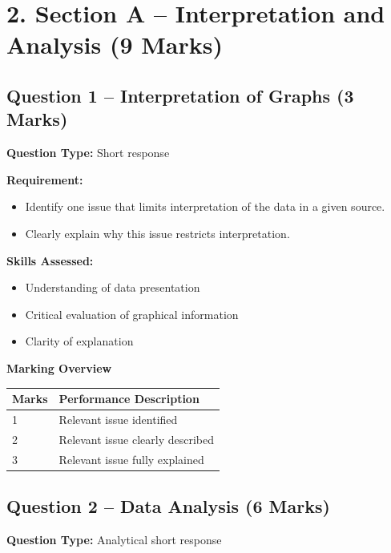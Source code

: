 \documentclass[12pt,a4paper]{article}
\begin{document}
\section*{2. Section A – Interpretation and Analysis (9 Marks)}

\subsection*{Question 1 – Interpretation of Graphs (3 Marks)}

\textbf{Question Type:} Short response  

\textbf{Requirement:}
\begin{itemize}
    \item Identify one issue that limits interpretation of the data in a given source.
    \item Clearly explain why this issue restricts interpretation.
\end{itemize}

\textbf{Skills Assessed:}
\begin{itemize}
    \item Understanding of data presentation
    \item Critical evaluation of graphical information
    \item Clarity of explanation
\end{itemize}

\textbf{Marking Overview}

\begin{center}
\begin{tabular}{ll}
\toprule
\textbf{Marks} & \textbf{Performance Description} \\
\midrule
1 & Relevant issue identified \\
2 & Relevant issue clearly described \\
3 & Relevant issue fully explained \\
\bottomrule
\end{tabular}
\end{center}

\vspace{1em}

\subsection*{Question 2 – Data Analysis (6 Marks)}

\textbf{Question Type:} Analytical short response  
\end{document}

